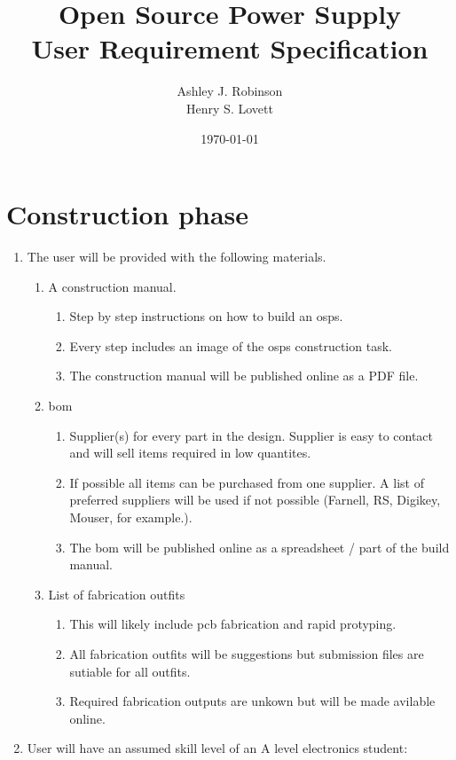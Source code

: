 \documentclass[12pt,a4paper]{article}
\title{Open Source Power Supply\\ User Requirement Specification}
\author{Ashley J. Robinson \\ Henry S. Lovett}
\date{\today}
\begin{document}
\maketitle



\section{Construction phase}
\begin{enumerate}[label*=\arabic*.]
\item The user will be provided with the following materials.
	\begin{enumerate}[label*=\arabic*.]
	\item A construction manual.
		\begin{enumerate}[label*=\arabic*.]
		\item Step by step instructions on how to build an \gls{osps}.
		\item Every step includes an image of the \gls{osps} construction task. 
		\item The construction manual will be published online as a PDF file.
		\end{enumerate}
	\item \gls{bom}
		\begin{enumerate}[label*=\arabic*.]
		\item Supplier(s) for every part in the design. Supplier is easy to contact and will sell items required in low quantites.
		\item If possible all items can be purchased from one supplier. A list of preferred suppliers will be used if not possible (Farnell, RS, Digikey, Mouser, for example.).
		\item The \gls{bom} will be published online as a spreadsheet / part of the build manual.
		\end{enumerate}
	\item List of fabrication outfits
		\begin{enumerate}[label*=\arabic*.]
		\item This will likely include \gls{pcb} fabrication and rapid protyping.
		\item All fabrication outfits will be suggestions but submission files are sutiable for all outfits.
		\item Required fabrication outputs are unkown but will be made avilable online.
		\end{enumerate}
	\end{enumerate}
\item User will have an assumed skill level of an A level electronics student:

\end{enumerate}
\end{document}
